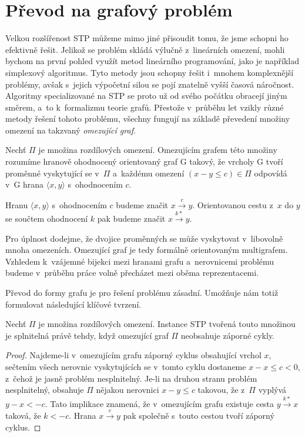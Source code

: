 \section{Převod na grafový problém}

Velkou rozšířenost STP můžeme mimo jiné přisoudit tomu, že jsme schopni ho efektivně řešit. Jelikož se problém skládá výlučně z~lineárních omezení, mohli bychom na první pohled využít metod lineárního programování, jako je například simplexový algoritmus. Tyto metody jsou schopny řešit i~mnohem komplexnější problémy, avšak s~jejich výpočetní silou se pojí znatelně vyšší časová náročnost. Algoritmy specializované na STP se proto už od svého počátku \cite[Kapitola 2]{Dechter91} obracejí jiným směrem, a~to k~formalizmu teorie grafů. Přestože v~průběhu let vzikly různé metody řešení tohoto problému, všechny fungují na základě převedení množiny omezení na takzvaný \emph{omezující graf}.

\begin{definice}
	Nechť $\Pi$ je množina rozdílových omezení. Omezujícím grafem této množiny rozumíme hranově ohodnocený orientovaný graf G takový, že vrcholy G tvoří proměnné vyskytující se v~$\Pi$ a~každému omezení $(x-y \leq c) \in \Pi$ odpovídá v~G hrana $\langle x,y\rangle$ s~ohodnocením $c$.
\end{definice}
\begin{pozn}
	Hranu $\langle x,y\rangle$ s~ohodnocením $c$ budeme značit $x \xrightarrow{c} y$. Orientovanou cestu z~$x$ do $y$ se součtem ohodnocení $k$ pak budeme značit $x \xrightarrow{k*} y$.
\end{pozn}

Pro úplnost dodejme, že dvojice proměnných se může vyskytovat v~libovolně mnoha omezeních. Omezující graf je tedy formálně orientovaným multigrafem. Vzhledem k~vzájemné bijekci mezi hranami grafu a~nerovnicemi problému budeme v~průběhu práce volně přecházet mezi oběma reprezentacemi.

Převod do formy grafu je pro řešení problému zásadní. Umožňuje nám totiž formulovat následující klíčové tvrzení.

\begin{tvrz}
	Nechť $\Pi$ je množina rozdílových omezení. Instance STP tvořená touto množinou je splnitelná právě tehdy, když omezující graf $\Pi$ neobsahuje záporné cykly.
\end{tvrz}
\begin{proof}
	Najdeme-li v~omezujícím grafu záporný cyklus obsahující vrchol $x$, sečtením všech nerovnic vyskytujících se v~tomto cyklu dostaneme $x-x \leq c < 0$, z~čehož je jasně problém nesplnitelný. Je-li na druhou stranu problém nesplnitelný, obsahuje $\Pi$ nějakou nerovnici $x - y \leq c$ takovou, že z~$\Pi$ vyplývá $y - x < -c$. Tato implikace znamená, že v~omezujícím grafu existuje cesta $y \xrightarrow{k*} x$ taková, že $k < -c$. Hrana $x \xrightarrow{c} y$ pak společně s~touto cestou tvoří záporný cyklus.
\end{proof}


